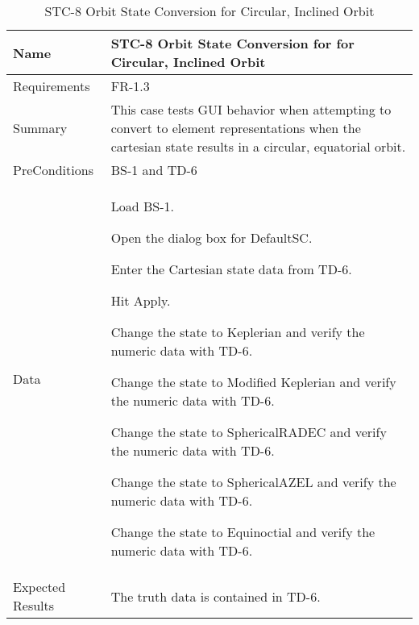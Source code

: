 \begin{table}[htbp!]
\centering
      \begin{tabular}{|p{1.05 in} |p{4.75 in} |}
      \hline
         \rowcolor[rgb]{0.8,0.8,0.8} Name & STC-8 Orbit State Conversion for for Circular, Inclined Orbit\\
         \hline
         Requirements & FR-1.3\\  \hline
         Summary &
         This  case tests GUI behavior when attempting to convert to element representations when the
         cartesian state results in a circular, equatorial orbit.
         \\     \hline
         PreConditions & BS-1 and TD-6\\     \hline
         Data &
         \begin{compactenum}
             \item Load BS-1.
             \item Open the dialog box for DefaultSC.
             \item Enter the Cartesian state data from TD-6.
             \item Hit Apply.
             \item Change the state to Keplerian and verify the numeric data with TD-6.
             \item Change the state to Modified Keplerian and verify the numeric data with TD-6.
             \item Change the state to SphericalRADEC and verify the numeric data with TD-6.
             \item Change the state to SphericalAZEL and verify the numeric data with TD-6.
             \item Change the state to Equinoctial and verify the numeric data with TD-6.
         \end{compactenum}
         \\ \hline
         Expected Results & The truth data is contained in TD-6.\\
      \hline
      \end{tabular}
      \label{Table:STC-8}
      \caption{STC-8 Orbit State Conversion for Circular, Inclined Orbit}
\end{table} 